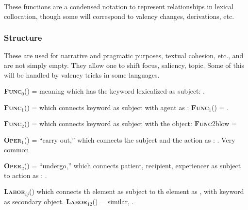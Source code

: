 \newcommand{\Incep}[1]{\textsc{\textbf{Incep}}(#1)}
\newcommand{\Cont}[1]{\textsc{\textbf{Cont}}(#1)}
\newcommand{\Fin}[1]{\textsc{\textbf{Fin}}(#1)}
\newcommand{\Caus}[1]{\textsc{\textbf{Caus}}(#1)}
\newcommand{\Liqu}[1]{\textsc{\textbf{Liqu}}(#1)}
\newcommand{\Perm}[1]{\textsc{\textbf{Perm}}(#1)}

\newcommand{\F}[1]{\textsc{\textbf{#1}}}
\newcommand{\Fsimp}[2]{\F{#1}(\E{#2})}
\newcommand{\FMod}[3]{\F{#1}$_{#2}$(\E{#3})}

These functions are a condensed notation to represent relationships in
lexical collocation, though some will correspond to valency changes,
derivations, etc.


\subsubsection*{Structure}
These are used for narrative and pragmatic purposes, textual cohesion,
etc., and are not simply empty.  They allow one to shift focus,
saliency, topic.  Some of this will be handled by valency tricks in
some languages.

\begin{multicols}{2}
\FMod{Func}{0}{} =  meaning  which has the
keyword lexicalized as subject: .

\FMod{Func}{1}{} =  which connects keyword as subject with agent
as :  \FMod{Func}{1}{blow} = .

\FMod{Func}{2}{} =  which connects keyword as subject with the
object: \F{Func}{2}{blow} = 

\FMod{Oper}{1}{} = ``carry out,''  which connects the subject and
the action as : .  Very common

\FMod{Oper}{2}{} = ``undergo,''  which connects patient,
recipient, experiencer as subject to action as : .

\FMod{Labor}{ij} =  which connects th element as subject to
th element as , with keyword as secondary
object. \FMod{Labor}{12}{interrogation} =  similar, .
\end{multicols}


